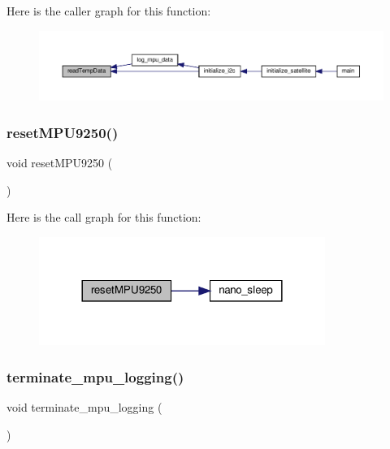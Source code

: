 Here is the caller graph for this function\+:
\nopagebreak
\begin{figure}[H]
\begin{center}
\leavevmode
\includegraphics[width=350pt]{i2c-interface_8c_aa12b154e59ddb443b65da8f4458146db_icgraph}
\end{center}
\end{figure}
\mbox{\label{i2c-interface_8c_a34e6720f7e9da9aa7bdd3d3afec24f77}} 
\subsubsection{\texorpdfstring{reset\+M\+P\+U9250()}{resetMPU9250()}}
{\footnotesize\ttfamily void reset\+M\+P\+U9250 (\begin{DoxyParamCaption}{ }\end{DoxyParamCaption})}

Here is the call graph for this function\+:
\nopagebreak
\begin{figure}[H]
\begin{center}
\leavevmode
\includegraphics[width=264pt]{i2c-interface_8c_a34e6720f7e9da9aa7bdd3d3afec24f77_cgraph}
\end{center}
\end{figure}
\mbox{\label{i2c-interface_8c_a3644aefb56a2169f316b0f2510ffc56c}} 
\subsubsection{\texorpdfstring{terminate\+\_\+mpu\+\_\+logging()}{terminate\_mpu\_logging()}}
{\footnotesize\ttfamily void terminate\+\_\+mpu\+\_\+logging (\begin{DoxyParamCaption}{ }\end{DoxyParamCaption})}

